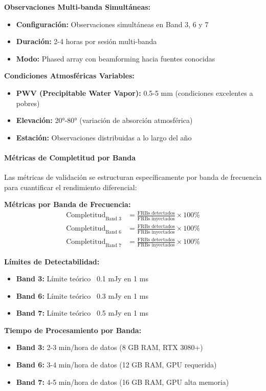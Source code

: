 \textbf{Observaciones Multi-banda Simultáneas:}
\begin{itemize}
\item \textbf{Configuración:} Observaciones simultáneas en Band 3, 6 y 7
\item \textbf{Duración:} 2-4 horas por sesión multi-banda
\item \textbf{Modo:} Phased array con beamforming hacia fuentes conocidas
\end{itemize}

\textbf{Condiciones Atmosféricas Variables:}
\begin{itemize}
\item \textbf{PWV (Precipitable Water Vapor):} 0.5-5 mm (condiciones excelentes a pobres)
\item \textbf{Elevación:} 20°-80° (variación de absorción atmosférica)
\item \textbf{Estación:} Observaciones distribuidas a lo largo del año
\end{itemize}

\paragraph{Métricas de Completitud por Banda}

Las métricas de validación se estructuran específicamente por banda de frecuencia para cuantificar el rendimiento diferencial:

\textbf{Métricas por Banda de Frecuencia:}
\begin{align}
\text{Completitud}_{\text{Band 3}} &= \frac{\text{FRBs detectados}}{\text{FRBs inyectados}} \times 100\% \\
\text{Completitud}_{\text{Band 6}} &= \frac{\text{FRBs detectados}}{\text{FRBs inyectados}} \times 100\% \\
\text{Completitud}_{\text{Band 7}} &= \frac{\text{FRBs detectados}}{\text{FRBs inyectados}} \times 100\%
\end{align}

\textbf{Límites de Detectabilidad:}
\begin{itemize}
\item \textbf{Band 3:} Límite teórico ~0.1 mJy en 1 ms
\item \textbf{Band 6:} Límite teórico ~0.3 mJy en 1 ms  
\item \textbf{Band 7:} Límite teórico ~0.5 mJy en 1 ms
\end{itemize}

\textbf{Tiempo de Procesamiento por Banda:}
\begin{itemize}
\item \textbf{Band 3:} 2-3 min/hora de datos (8 GB RAM, RTX 3080+)
\item \textbf{Band 6:} 3-4 min/hora de datos (12 GB RAM, GPU requerida)
\item \textbf{Band 7:} 4-5 min/hora de datos (16 GB RAM, GPU alta memoria)
\end{itemize}

